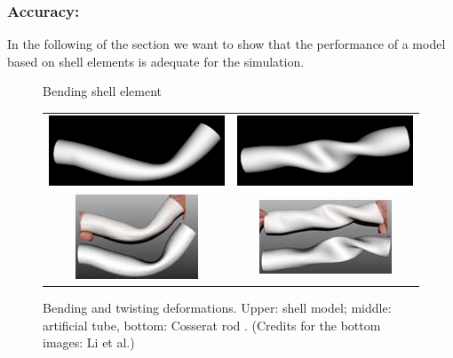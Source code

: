\subsubsection{Accuracy: } 
In the following of the section we want to show that the performance of a model
based on shell elements is adequate for the simulation.

\begin{figure}[tbh]
  \begin{minipage}[b]{0.3\linewidth}
      \framebox[1cm]{\rule{0pt}{1cm}}
      \caption{Bending shell element}
      \label{fig-shell}
  \end{minipage}
  \hspace{0.1\columnwidth}
  \begin{minipage}[b]{0.6\linewidth}
    \centering
    \begin{tabular}{cc}
     \includegraphics[width=0.5\columnwidth]{img/compare-bend.png}
      &
      \includegraphics[width=0.5\columnwidth]{img/compare-twist.png}
      \\
      \includegraphics[width=0.5\columnwidth]{img/compare-bend-other.png}
      &
      \includegraphics[width=0.5\columnwidth]{img/compare-twist-other.png}
    \end{tabular}
    \caption{Bending and twisting deformations. Upper: shell model; middle:
    artificial tube, bottom: Cosserat rod \cite{Li2009}. (Credits for the
    bottom images: Li et al.)}
    \label{fig-deformations}
  \end{minipage}
\end{figure}

